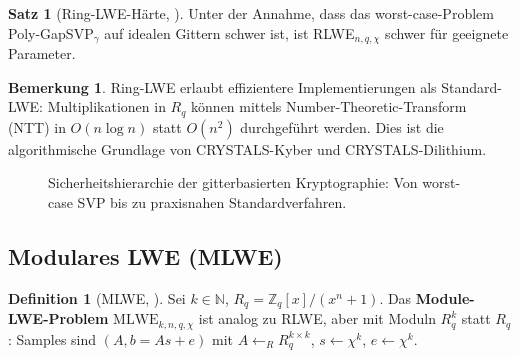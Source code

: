 ﻿\documentclass[a4paper,12pt]{article}
\theoremstyle{definition}
\newtheorem{definition}{Definition}[section]
\newtheorem{bemerkung}{Bemerkung}[section]
\newtheorem{satz}{Satz}[section]
\begin{document}
\begin{satz}[Ring-LWE-Härte, \cite{LPR10}]
Unter der Annahme, dass das worst-case-Problem Poly-GapSVP$_\gamma$ auf
idealen Gittern schwer ist, ist RLWE$_{n,q,\chi}$ schwer für geeignete Parameter.
\end{satz}

\begin{bemerkung}
Ring-LWE erlaubt effizientere Implementierungen als Standard-LWE: Multiplikationen
in $R_q$ können mittels Number-Theoretic-Transform (NTT) in $O(n \log n)$
statt $O(n^2)$ durchgeführt werden. Dies ist die algorithmische Grundlage
von CRYSTALS-Kyber und CRYSTALS-Dilithium.
\end{bemerkung}

\begin{figure}[H]
\centering
{}
\caption{Sicherheitshierarchie der gitterbasierten Kryptographie: Von worst-case SVP bis zu praxisnahen Standardverfahren.}
\label{fig:haertebaum}
\end{figure}

\subsection{Modulares LWE (MLWE)}

\begin{definition}[MLWE, \cite{LS15}]
Sei $k \in \mathbb{N}$, $R_q = \mathbb{Z}_q[x]/(x^n+1)$.
Das \textbf{Module-LWE-Problem} $\mathrm{MLWE}_{k,n,q,\chi}$ ist analog zu RLWE,
aber mit Moduln $R_q^k$ statt $R_q$: Samples sind $(A, b = As + e)$ mit
$A \leftarrow_R R_q^{k \times k}$, $s \leftarrow \chi^k$, $e \leftarrow \chi^k$.
\end{definition}
\end{document}
